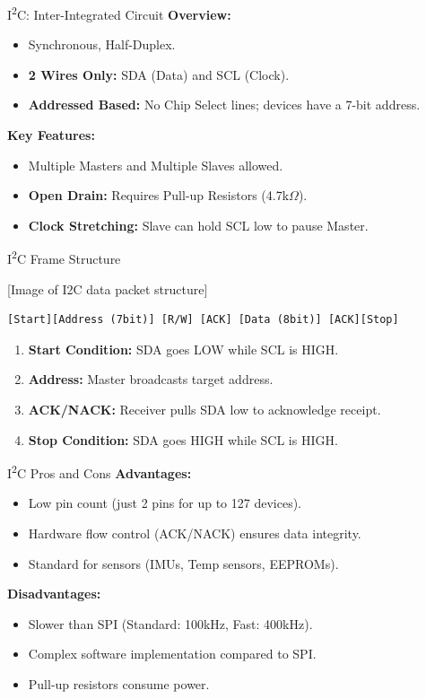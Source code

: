 \begin{frame}{I\textsuperscript{2}C: Inter-Integrated Circuit}
\textbf{Overview:}
\begin{itemize}
    \item Synchronous, Half-Duplex.
    \item \textbf{2 Wires Only:} SDA (Data) and SCL (Clock).
    \item \textbf{Addressed Based:} No Chip Select lines; devices have a 7-bit address.
\end{itemize}

\textbf{Key Features:}
\begin{itemize}
    \item Multiple Masters and Multiple Slaves allowed.
    \item \textbf{Open Drain:} Requires Pull-up Resistors (4.7k$\Omega$).
    \item \textbf{Clock Stretching:} Slave can hold SCL low to pause Master.
\end{itemize}
\end{frame}

\begin{frame}[fragile]{I\textsuperscript{2}C Frame Structure}


[Image of I2C data packet structure]

\begin{verbatim}
[Start][Address (7bit)] [R/W] [ACK] [Data (8bit)] [ACK][Stop]
\end{verbatim}

\begin{enumerate}
    \item \textbf{Start Condition:} SDA goes LOW while SCL is HIGH.
    \item \textbf{Address:} Master broadcasts target address.
    \item \textbf{ACK/NACK:} Receiver pulls SDA low to acknowledge receipt.
    \item \textbf{Stop Condition:} SDA goes HIGH while SCL is HIGH.
\end{enumerate}
\end{frame}

\begin{frame}{I\textsuperscript{2}C Pros and Cons}
\textbf{Advantages:}
\begin{itemize}
    \item Low pin count (just 2 pins for up to 127 devices).
    \item Hardware flow control (ACK/NACK) ensures data integrity.
    \item Standard for sensors (IMUs, Temp sensors, EEPROMs).
\end{itemize}

\textbf{Disadvantages:}
\begin{itemize}
    \item Slower than SPI (Standard: 100kHz, Fast: 400kHz).
    \item Complex software implementation compared to SPI.
    \item Pull-up resistors consume power.
\end{itemize}
\end{frame}

